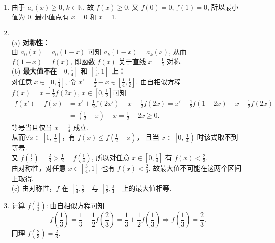 \begin{solution}
    \begin{enumerate}[leftmargin=*,label=\arabic*.]%
    \item 
    由于 \( a_k(x) \geq 0,\,k\in\mathbb{N} \), 故 \( f(x) \geq 0 \). 又 \( f(0)=0 \), \( f(1)=0 \), 所以最小值为 0, 最小值点有 \( x=0 \) 和 \( x=1 \).
        
    \item\\
    (a) \textbf{对称性：}\\
    由 \( a_0(x)=a_0(1-x) \) 可知 \( a_k(1-x)=a_k(x) \), 从而 \( f(1-x)=f(x) \), 即函数 $f(x)$ 关于直线 $\displaystyle x=\frac{1}{2}$ 对称.\\
    (b) \textbf{最大值不在 \(\displaystyle \left[0,\frac{1}{4}\right]\) 和 \(\displaystyle \left[\frac{3}{4},1\right]\) 上：}\\
    对任意 \(\displaystyle  x \in \left[0,\frac{1}{4}\right] \), 令 \(\displaystyle x' = \frac{1}{2} - x \in \left[\frac{1}{4},\frac{1}{2}\right] \). 
    由自相似方程 \( \displaystyle f(x)=x+\frac{1}{2}f(2x),\, x\in\left[0,\frac{1}{2}\right] \)可知
    \[
    \begin{aligned}
    f(x') - f(x) &=x'+\frac{1}{2}f(2x')-x-\frac{1}{2}f(2x)=x'+\frac{1}{2}f(1-2x)-x-\frac{1}{2}f(2x)\\
    &=\left(\frac{1}{2}-x\right) - x = \frac{1}{2}-2x \geq 0.
    \end{aligned}
    \]
    等号当且仅当 \(\displaystyle x=\frac{1}{4} \) 成立.\\
    从而$\displaystyle \forall x\in \left[0,\,\frac{1}{4}\right]$，有 $\displaystyle f(x)\leq f\left(\frac{1}{2}-x\right)$，
    且当 $\displaystyle x\in \left[0,\,\frac{1}{4}\right)$ 时该式取不到等号.\\
    又 \(\displaystyle f(\frac{1}{3})=\frac{2}{3} > \frac{1}{2} = f(\frac{1}{4}) \), 
    所以对任意 \(\displaystyle x \in \left[0,\frac{1}{4}\right] \) 有 \(\displaystyle f(x) < \frac{2}{3} \). \\
    由对称性，对任意 \(\displaystyle x \in \left[\frac{3}{4},1\right] \) 也有 \(\displaystyle f(x) < \frac{2}{3} \). 故最大值不可能在这两个区间上取得.\\
    (c) 由对称性，\( f \) 在 \(\displaystyle \left[\frac{1}{4},\frac{1}{2}\right]\) 与 \(\displaystyle\left[\frac{1}{2},\frac{3}{4}\right]\) 上的最大值相等. 

    \item 
    计算 \(\displaystyle f\left(\frac{1}{3}\right) \): 由自相似方程可知
    \[
    f\left(\frac{1}{3}\right) = \frac{1}{3} + \frac{1}{2} f\left(\frac{2}{3}\right) = \frac{1}{3} + \frac{1}{2} f\left(\frac{1}{3}\right)  \Rightarrow  f\left(\frac{1}{3}\right) = \frac{2}{3}.
    \]
    同理 \(\displaystyle f\left(\frac{2}{3}\right)=\frac{2}{3} \).


\end{enumerate}
\end{solution}
